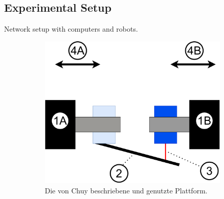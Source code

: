 \chapter{}
\label{sec:results}
\section{Experimental Setup}
Network setup with computers and robots.
\begin{figure}[htbp]
	\centering
	   \begin{subfigure}[b]{0.4\textwidth}
	   	\includegraphics[width=1.2\textwidth]{Figures/c6/schematic_meassurement.pdf}
	   	\caption{Die von Chuy beschriebene und genutzte Plattform.}
	   	\label{K2_chuy_robot_P}
	   \end{subfigure}
	   \hspace{2cm}
	   \begin{subfigure}[b]{0.4\textwidth}

\end{subfigure}
\end{figure}
